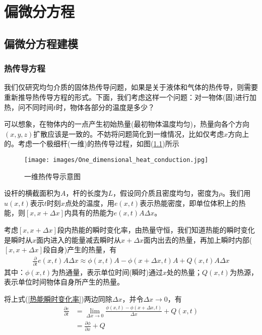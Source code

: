 
\chapter{偏微分方程}
\section{偏微分方程建模}
    \subsection{热传导方程}
        我们仅研究均匀介质的固体热传导问题，如果是关于液体和气体的热传导，则需要重新推导热传导方程的形式。下面，我们考虑这样一个问题：对一物体(固)进行加热，问不同时间$t$时，物体各部分的温度是多少？
        \par
        可以想象，在物体内的一点产生初始热量(最初物体温度均匀)，热量向各个方向$(x,y,z)$扩散应该是一致的。不妨将问题简化到一维情况，比如仅考虑$x$方向上的。考虑一个极细杆(一维)的热传导过程，如图(\ref{fig:一维热传导示意图})所示\\
		 \begin{figure}[H]
		\centering
		\texttt{[image: images/One\_dimensional\_heat\_conduction.jpg]}
		\caption{一维热传导示意图}
		\label{fig:一维热传导示意图}
		\end{figure}
        \par
        设杆的横截面积为$A$，杆的长度为$L$，假设同介质且密度均匀，密度为$\rho$。我们用$u(x,t)$表示$t$时刻$x$点处的温度，用$e(x,t)$表示热能密度，即单位体积上的热能，则$[x,x+\Delta x]$内具有的热能为$e(x,t) A \Delta x$。
        \par
        考虑$[x,x+\Delta x]$段内热能的瞬时变化率，由热量守恒，我们知道热能的瞬时变化是瞬时从$x$面内进入的能量减去瞬时从$x + \Delta x$面内出去的热量，再加上瞬时内部($[x,x+\Delta x]$段自身)产生的热量，有
        \begin{align}
            \label{热能瞬时变化率}
            \frac{\partial}{\partial t} e(x,t)A \Delta x \approx \phi(x,t)A - \phi (x+\Delta x, t) A + Q(x,t) A \Delta x
        \end{align}
        其中：$\phi(x,t)$为热通量，表示单位时间(瞬时)通过$x$处的热量；$Q(x,t)$为热源，表示单位时间物体自身所产生的热量。
        \par
        将上式(\ref{热能瞬时变化率})两边同除$\Delta x$，并令$\Delta x\rightarrow 0$，有
        \begin{align*}
            \frac{\partial e}{\partial t} &= \lim_{\Delta x \rightarrow 0} \frac{\phi (x,t) - \phi (x + \Delta x,t)}{\Delta x} + Q(x, t) \\
            &= \frac{\partial \phi }{\partial x} + Q
        \end{align*}
